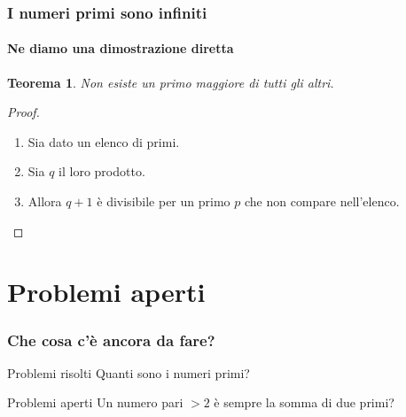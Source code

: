 \documentclass{beamer} %
\theoremstyle{definition}
\theoremstyle{plain}
\newtheorem{teorema}{Teorema}
\begin{document}
\begin{frame}
  \frametitle{I numeri primi sono infiniti}
  \framesubtitle{Ne diamo una dimostrazione diretta}
  
  \begin{teorema}
    Non esiste un primo maggiore di tutti gli altri.
  \end{teorema}
  
  \pause %
  
  \begin{proof}
    \begin{enumerate}[<+->]
      \item Sia dato un elenco di primi.
      \item Sia $q$ il loro prodotto.
      \item Allora $q+1$ è divisibile per un primo $p$ che non compare nell’elenco. \qedhere
    \end{enumerate}
  \end{proof}
\end{frame}


\section{Problemi aperti}

\begin{frame}
  \frametitle{Che cosa c’è ancora da fare?}
  
  \begin{block}{Problemi risolti}
    Quanti sono i numeri primi?
  \end{block}
  
  \begin{alertblock}{Problemi aperti}
    Un \alert{numero} pari $>2$ è sempre la somma di due primi?
  \end{alertblock}
\end{frame}

\end{document}
